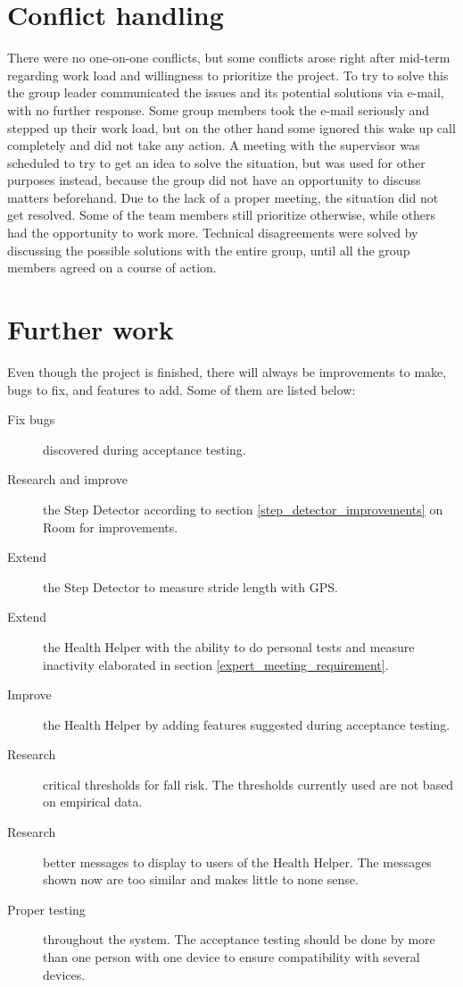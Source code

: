 \section{Conflict handling}
There were no one-on-one conflicts, but some conflicts arose right after mid-term regarding work load and willingness to prioritize the project. To try to solve this the group leader communicated the issues and its potential solutions via e-mail, with no further response. Some group members took the e-mail seriously and stepped up their work load, but on the other hand some ignored this wake up call completely and did not take any action. A meeting with the supervisor was scheduled to try to get an idea to solve the situation, but was used for other purposes instead, because the group did not have an opportunity to discuss matters beforehand. Due to the lack of a proper meeting, the situation did not get resolved. Some of the team members still prioritize otherwise, while others had the opportunity to work more.
Technical disagreements were solved by discussing the possible solutions with the entire group, until all the group members agreed on a course of action.

\section{Further work}
Even though the project is finished, there will always be improvements to make, bugs to fix, and features to add. Some of them are listed below:
\begin{description}
\item[Fix bugs] discovered during acceptance testing.
\item[Research and improve] the Step Detector according to section \ref{step_detector_improvements} on Room for improvements. 
\item[Extend] the Step Detector to measure stride length with GPS.
\item[Extend] the Health Helper with the ability to do personal tests and measure inactivity elaborated in section \ref{expert_meeting_requirement}.
\item[Improve] the Health Helper by adding features suggested during acceptance testing.
\item[Research] critical thresholds for fall risk. The thresholds currently used are not based on empirical data.
\item[Research] better messages to display to users of the Health Helper. The messages shown now are too similar and makes little to none sense.
\item[Proper testing] throughout the system. The acceptance testing should be done by more than one person with one device to ensure compatibility with several devices.
\end{description}
